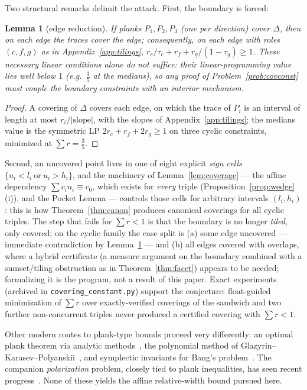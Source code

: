 \documentclass{aims}
\numberwithin{equation}{section}
\theoremstyle{plain}
\newtheorem{lemma}[theorem]{Lemma}
\theoremstyle{definition}
\theoremstyle{remark}
\begin{document}
Two structural remarks delimit the attack. First, the boundary is forced:

\begin{lemma}[edge reduction]\label{lem:edgered}
If planks $P_1,P_2,P_3$ (one per direction) cover $\Delta$, then on each edge
the traces cover the edge; consequently, on each edge with roles $(c,f,g)$ as
in Appendix~\ref{app:tilings},
$r_c/\tau_c+r_f+r_g/(1-\tau_g)\ge1$. These necessary linear conditions alone
do \emph{not} suffice: their linear-programming value lies well below $1$
(e.g.\ $\tfrac35$ at the medians), so any proof of
Problem~\ref{prob:covconst} must couple the boundary constraints with an
interior mechanism.
\end{lemma}

\begin{proof}
A covering of $\Delta$ covers each edge, on which the trace of $P_i$ is an
interval of length at most $r_i/|\text{slope}|$, with the slopes of
Appendix~\ref{app:tilings}; the medians value is the symmetric LP
$2r_c+r_f+2r_g\ge1$ on three cyclic constraints, minimized at
$\sum r=\tfrac35$.
\end{proof}

Second, an uncovered point lives in one of eight explicit \emph{sign cells}
$\{u_i<l_i\ \text{or}\ u_i>h_i\}$, and the machinery of
Lemma~\ref{lem:coverage} --- the affine dependency $\sum c_iu_i\equiv c_0$,
which exists for \emph{every} triple (Proposition~\ref{prop:wedge}(i)), and
the Pocket Lemma --- controls those cells for arbitrary intervals
$(l_i,h_i)$: this is how Theorem~\ref{thm:canon} produces canonical coverings
for all cyclic triples. The step that fails for $\sum r<1$ is that the
boundary is no longer \emph{tiled}, only covered; on the cyclic family the
case split is (a) some edge uncovered --- immediate contradiction by
Lemma~\ref{lem:edgered} --- and (b) all edges covered with overlaps, where a
hybrid certificate (a measure argument on the boundary combined with a
sumset/tiling obstruction as in Theorem~\ref{thm:facet}) appears to be
needed; formalizing it is the program, not a result of this paper.
Exact experiments (archived in \texttt{covering\_constant.py}) support the
conjecture: float-guided minimization of $\sum r$ over exactly-verified
coverings of the sandwich and two further non-concurrent triples never
produced a certified covering with $\sum r<1$.

Other modern routes to plank-type bounds proceed very differently: an optimal
plank theorem via analytic methods~\cite{OM21}, the polynomial method of
Glazyrin--Karasev--Polyanskii~\cite{GKP22}, and symplectic invariants for Bang's
problem~\cite{AKP19}. The companion \emph{polarization} problem, closely tied to
plank inequalities, has seen recent progress~\cite{Pinasco23,MOM26}. None of
these yields the affine relative-width bound pursued here.
\end{document}
